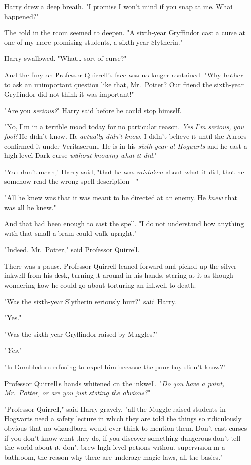 Harry drew a deep breath. "I promise I won't mind if you snap at me. What
happened?"

The cold in the room seemed to deepen. "A sixth-year Gryffindor cast a curse at
one of my more promising students, a sixth-year Slytherin."

Harry swallowed. "What{\ldots} sort of curse?"

And the fury on Professor Quirrell's face was no longer contained. "Why bother
to ask an unimportant question like that, Mr.~Potter? Our friend the sixth-year
Gryffindor did not think it was important!"

"Are you \emph{serious?}" Harry said before he could stop himself.

"No, I'm in a terrible mood today for no particular reason. \emph{Yes I'm
serious, you fool!} He didn't know. He \emph{actually didn't know.} I didn't
believe it until the Aurors confirmed it under Veritaserum. He is in his
\emph{sixth year at Hogwarts} and he cast a high-level Dark curse \emph{without
knowing what it did.}"

"You don't mean," Harry said, "that he was \emph{mistaken} about what it did,
that he somehow read the wrong spell description---"

"All he knew was that it was meant to be directed at an enemy. He \emph{knew}
that was all he knew."

And that had been enough to cast the spell. "I do not understand how anything
with that small a brain could walk upright."

"Indeed, Mr.~Potter," said Professor Quirrell.

There was a pause. Professor Quirrell leaned forward and picked up the silver
inkwell from his desk, turning it around in his hands, staring at it as though
wondering how he could go about torturing an inkwell to death.

"Was the sixth-year Slytherin seriously hurt?" said Harry.

"Yes."

"Was the sixth-year Gryffindor raised by Muggles?"

"\emph{Yes.}"

"Is Dumbledore refusing to expel him because the poor boy didn't know?"

Professor Quirrell's hands whitened on the inkwell. "\emph{Do you have a point,
Mr.~Potter, or are you just stating the obvious?}"

"Professor Quirrell," said Harry gravely, "all the Muggle-raised students in
Hogwarts need a safety lecture in which they are told the things so
ridiculously obvious that no wizardborn would ever think to mention them. Don't
cast curses if you don't know what they do, if you discover something dangerous
don't tell the world about it, don't brew high-level potions without
supervision in a bathroom, the reason why there are underage magic laws, all
the basics."

